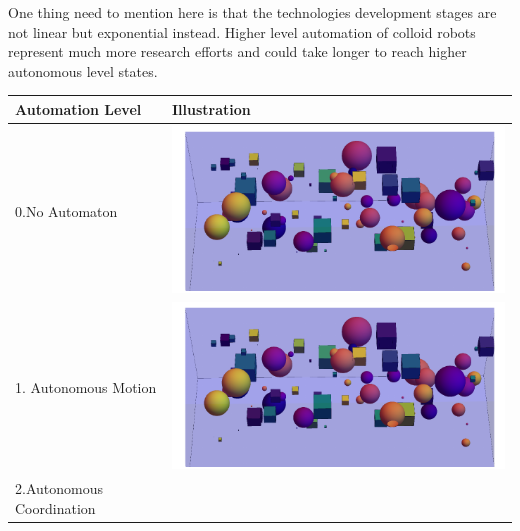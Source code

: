 One thing need to mention here is that the technologies development stages are not linear but exponential instead. Higher level automation of colloid robots  represent much more research efforts and could take longer to reach higher autonomous level states.

\begin{table}[h!]
  \centering
  \begin{tabular}{ | m{6cm} | m{6cm} | }
    \hline
    Automation Level & Illustration \\ \hline
     0.No Automaton
      &
      \begin{minipage}{.3\textwidth}
      \includegraphics[width=\linewidth]{figures/table1_1.pdf}
    \end{minipage}
    \\  \hline
      1. Autonomous Motion
  
      &
      \begin{minipage}{.3\textwidth}
      \includegraphics[width=\linewidth]{figures/table1_1.pdf}
    \end{minipage}
    \\  \hline
      2.Autonomous Coordination
    

\end{tabular}
\end{table}
